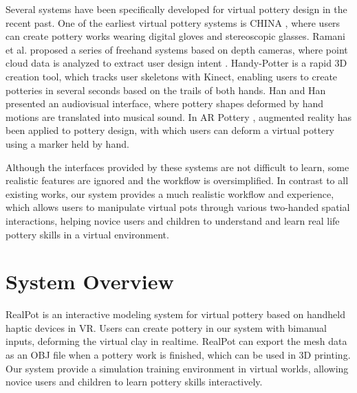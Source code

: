 \documentclass{svjour3}                     %
\begin{document}
Several systems have been specifically developed for virtual pottery design in the recent past.
One of the earliest virtual pottery systems is CHINA \cite{korida1997interactive}, where users can create pottery works wearing digital gloves and stereoscopic glasses.
Ramani et al. proposed a series of freehand systems based on depth cameras, where point cloud data is analyzed to extract user design intent \cite{ramani2014zpots,ramani2015gesture,ramani2016extracting}.
Handy-Potter \cite{murugappan2013handy} is a rapid 3D creation tool, which tracks user skeletons with Kinect, enabling users to create potteries in several seconds based on the trails of both hands.
Han and Han \cite{han2014virtual} presented an audiovisual interface, where pottery shapes deformed by hand motions are translated into musical sound.
In AR Pottery \cite{han2007ar}, augmented reality has been applied to pottery design, with which users can deform a virtual pottery using a marker held by hand.

Although the interfaces provided by these systems are not difficult to learn, some realistic features are ignored and the workflow is oversimplified.
In contrast to all existing works, our system provides a much realistic workflow and experience, which allows users to manipulate virtual pots through various two-handed spatial interactions, helping novice users and children to understand and learn real life pottery skills in a virtual environment.


\section{System Overview}
\label{sec:3}
RealPot is an interactive modeling system for virtual pottery based on handheld haptic devices in VR.
Users can create pottery in our system with bimanual inputs, deforming the virtual clay in realtime.
RealPot can export the mesh data as an OBJ file when a pottery work is finished, which can be used in 3D printing.
Our system provide a simulation training environment in virtual worlds, allowing novice users and children to learn pottery skills interactively.
\end{document}
